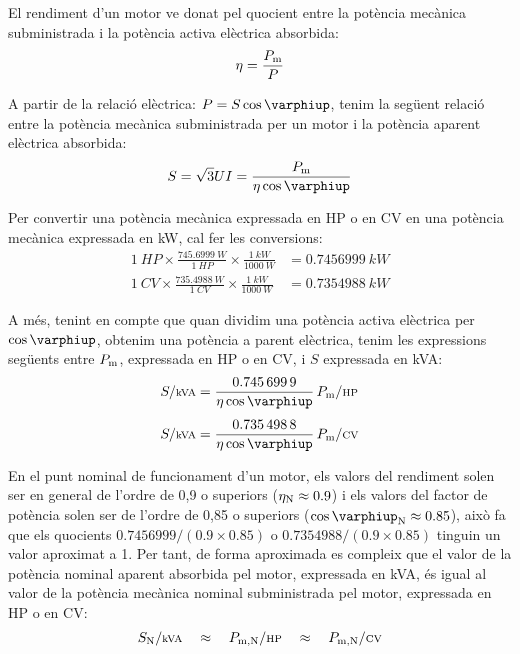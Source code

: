El rendiment d'un motor ve donat pel quocient entre la potència mecànica subministrada i la potència activa elèctrica absorbida:
\begin{equation}\index{rendiment}\index{potència mecànica}
    \eta = \frac{P\ped{m}}{P}
\end{equation}

A partir de la relació elèctrica: $P = S \cos\varphiup$, tenim la següent relació entre la potència mecànica subministrada per un motor i la potència aparent elèctrica absorbida:
\begin{equation}
    S = \sqrt{3} U I = \frac{P\ped{m}}{\eta \cos\varphiup}
\end{equation}

Per  convertir una potència mecànica expressada en HP o en CV en una  potència mecànica expressada en kW, cal  fer les conversions:
\begin{subequations}
\begin{align}
  \SI{1}{HP} \times \frac{\SI{745,6999}{W}}{\SI{1}{HP}} \times \frac{\SI{1}{kW}}{\SI{1000}{W}} &= \SI{0,7456999}{kW} \\[1ex]
  \SI{1}{CV} \times \frac{\SI{735,4988}{W}}{\SI{1}{CV}} \times \frac{\SI{1}{kW}}{\SI{1000}{W}} &= \SI{0,7354988}{kW}
\end{align}
\end{subequations}

 A més, tenint en compte que quan dividim una potència activa elèctrica per $\cos\varphiup$, obtenim una potència a parent elèctrica, tenim les expressions següents entre $P\ped{m}$, expressada en HP o en CV, i $S$ expressada en kVA:
\begin{align}
    S/{\scriptstyle\si{kVA}} &= \frac{\num{0,7456999}}{\eta \cos\varphiup}\,   P\ped{m}/{\scriptstyle\si{HP}} \\[1ex]
    S/{\scriptstyle\si{kVA}} &= \frac{\num{0,7354988}}{\eta \cos\varphiup}\,   P\ped{m}/{\scriptstyle\si{CV}}
\end{align}

En el punt nominal de funcionament d'un motor, els valors del rendiment solen ser en general de l'ordre de 0,9 o superiors ($\eta\ped{N} \approx \num{0,9}$) i els valors del factor de potència solen ser de l'ordre de 0,85 o superiors ($\cos\varphiup\ped{N} \approx \num{0,85}$), això fa que els quocients $\num{0,7456999}/(\num{0,9} \times \num{0,85})$ o $\num{0,7354988}/(\num{0,9} \times \num{0,85})$ tinguin un valor aproximat a 1. Per tant, de forma aproximada es compleix que el valor de la potència nominal aparent absorbida pel motor, expressada en kVA, és igual al valor de la potència mecànica nominal subministrada pel motor, expressada en HP o en CV:
\begin{equation}\label{eq:kVA-CV-HP}
    S\ped{N}/{\scriptstyle \si{kVA}} \quad\approx\quad  P\ped{m,N}/{\scriptstyle \si{HP}} \quad\approx\quad  P\ped{m,N}/{\scriptstyle \si{CV}}
\end{equation}


